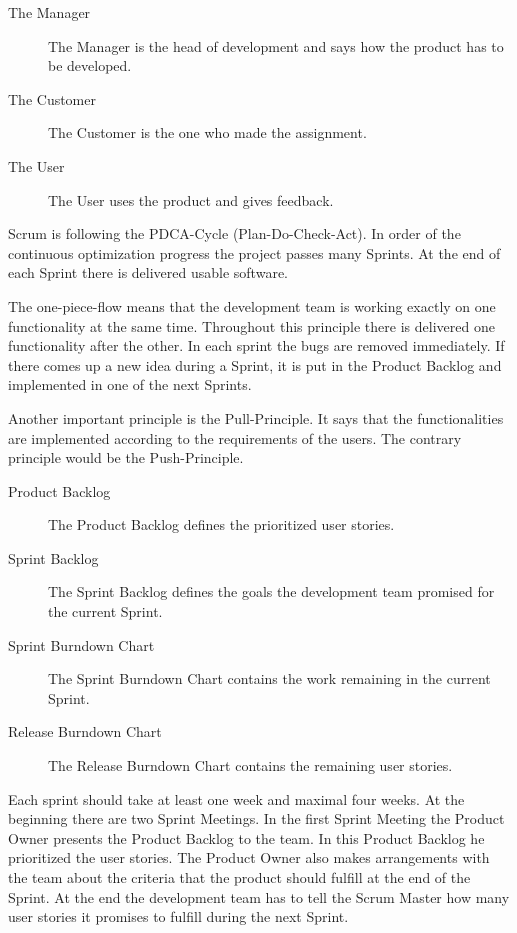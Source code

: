 
\begin{description}
   \item[The Manager] The Manager is the head of development and says how
           the product has to be developed.
   \item[The Customer] The Customer is the one who made the assignment.
   \item[The User] The User uses the product and gives feedback.~\cite{five}
\end{description}

Scrum is following the PDCA-Cycle (Plan-Do-Check-Act). In order of the
continuous optimization progress the project passes many Sprints. At the end
of each Sprint there is delivered usable software.

The one-piece-flow means that the development team is working exactly on one
functionality at the same time. Throughout this principle there is delivered
one functionality after the other. In each sprint the bugs are removed
immediately. If there comes up a new idea during a Sprint, it is put in the Product
Backlog and implemented in one of the next Sprints.

Another important principle is the Pull-Principle. It says that the
functionalities are implemented according to the requirements of the users.
The contrary principle would be the Push-Principle.~\cite{five}


\begin{description}
   \item[Product Backlog] The Product Backlog defines the prioritized user
           stories.
   \item[Sprint Backlog] The Sprint Backlog defines the goals the development
           team promised for the current Sprint.
   \item[Sprint Burndown Chart] The Sprint Burndown Chart contains the work
           remaining in the current Sprint.
   \item[Release Burndown Chart] The Release Burndown Chart contains the remaining
           user stories.~\cite{eight}
\end{description}


Each sprint should take at least one week and maximal four weeks. At the beginning
there are two Sprint Meetings. In the first Sprint Meeting the Product Owner
presents the Product Backlog to the team. In this Product Backlog he
prioritized the user stories. The Product Owner also makes arrangements with
the team about the criteria that the product should fulfill at the end of the
Sprint. At the end the development team has to tell the Scrum Master how many
user stories it promises to fulfill during the next Sprint.

